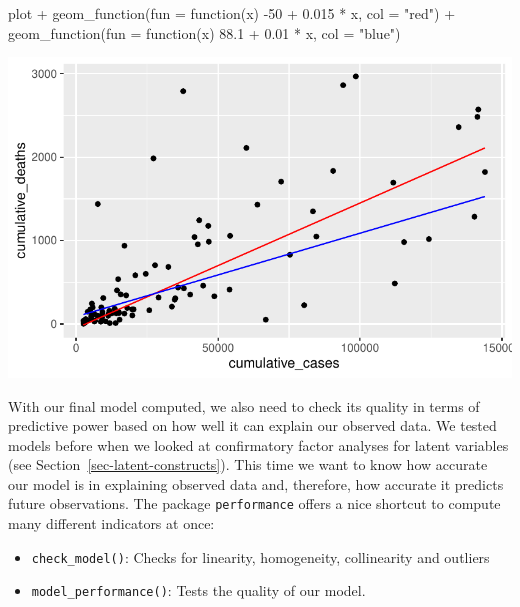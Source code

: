 \documentclass[
  letterpaper,
]{krantz}
\makeatletter
\newenvironment{Shaded}{\begin{snugshade}}{\end{snugshade}}
\newcommand{\AttributeTok}[1]{\textcolor[rgb]{0.40,0.45,0.13}{#1}}
\newcommand{\ControlFlowTok}[1]{\textcolor[rgb]{0.00,0.23,0.31}{#1}}
\newcommand{\DecValTok}[1]{\textcolor[rgb]{0.68,0.00,0.00}{#1}}
\newcommand{\FloatTok}[1]{\textcolor[rgb]{0.68,0.00,0.00}{#1}}
\newcommand{\FunctionTok}[1]{\textcolor[rgb]{0.28,0.35,0.67}{#1}}
\newcommand{\NormalTok}[1]{\textcolor[rgb]{0.00,0.23,0.31}{#1}}
\newcommand{\SpecialCharTok}[1]{\textcolor[rgb]{0.37,0.37,0.37}{#1}}
\newcommand{\StringTok}[1]{\textcolor[rgb]{0.13,0.47,0.30}{#1}}
\newenvironment{kframe}{%
\medskip{}
\setlength{\fboxsep}{.8em}
 \def\at@end@of@kframe{}%
 \ifinner\ifhmode%
  \def\at@end@of@kframe{\end{minipage}}%
  \begin{minipage}{\columnwidth}%
 \fi\fi%
 \def\FrameCommand##1{\hskip\@totalleftmargin \hskip-\fboxsep
 \colorbox{shadecolor}{##1}\hskip-\fboxsep
     \hskip-\linewidth \hskip-\@totalleftmargin \hskip\columnwidth}%
 \MakeFramed {\advance\hsize-\width
   \@totalleftmargin\z@ \linewidth\hsize
   \@setminipage}}%
 {\par\unskip\endMakeFramed%
 \at@end@of@kframe}
\renewenvironment{Shaded}{\begin{kframe}}{\end{kframe}}
\makeatother
\begin{document}
\begin{Shaded}
\begin{Highlighting}[]
\NormalTok{plot }\SpecialCharTok{+}
  \FunctionTok{geom\_function}\NormalTok{(}\AttributeTok{fun =} \ControlFlowTok{function}\NormalTok{(x) }\SpecialCharTok{{-}}\DecValTok{50} \SpecialCharTok{+} \FloatTok{0.015} \SpecialCharTok{*}\NormalTok{ x, }\AttributeTok{col =} \StringTok{"red"}\NormalTok{) }\SpecialCharTok{+}
    \FunctionTok{geom\_function}\NormalTok{(}\AttributeTok{fun =} \ControlFlowTok{function}\NormalTok{(x) }\FloatTok{88.1} \SpecialCharTok{+} \FloatTok{0.01} \SpecialCharTok{*}\NormalTok{ x, }\AttributeTok{col =} \StringTok{"blue"}\NormalTok{)}
\end{Highlighting}
\end{Shaded}

\includegraphics{13_regressions_files/figure-pdf/comparing-computed-vs-hand-fitted-1.pdf}

With our final model computed, we also need to check its quality in
terms of predictive power based on how well it can explain our observed
data. We tested models before when we looked at confirmatory factor
analyses for latent variables (see Section~\ref{sec-latent-constructs}).
This time we want to know how accurate our model is in explaining
observed data and, therefore, how accurate it predicts future
observations. The package \texttt{performance} offers a nice shortcut to
compute many different indicators at once:

\begin{itemize}
\item
  \texttt{check\_model()}: Checks for linearity, homogeneity,
  collinearity and outliers
\item
  \texttt{model\_performance()}: Tests the quality of our model.
\end{itemize}
\end{document}
